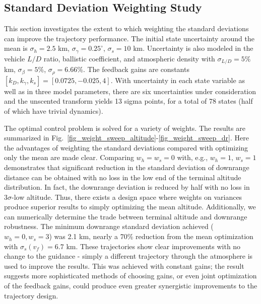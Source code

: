 \documentclass[journal ]{new-aiaa}
\begin{document}
\subsection*{Standard Deviation Weighting Study}
This section investigates the extent to which weighting the standard deviations can improve the trajectory performance. The initial state uncertainty around the mean is $\sigma_h = 2.5$ km, $\sigma_{\gamma} = 0.25^{\circ}$, $\sigma_s = 10$ km. Uncertainty is also modeled in the vehicle $L/D$ ratio, ballistic coefficient, and atmospheric density with $\sigma_{L/D} = 5\%$ km, $\sigma_{\beta} = 5\%$, $\sigma_{\rho} = 6.66\%$. The feedback gains are constants $[k_D, k_{\gamma}, k_s] = [0.0725, -0.025, 4]$. With uncertainty in each state variable as well as in three model parameters, there are six uncertainties under consideration and the unscented transform yields 13 sigma points, for a total of 78 states (half of which have trivial dynamics). 

The optimal control problem is solved for a variety of weights. The results are summarized in Fig.~\ref{fig_weight_sweep_altitude}-\ref{fig_weight_sweep_dr}. Here the advantages of weighting the standard deviations compared with optimizing only the mean are made clear. Comparing $w_h=w_s=0$ with, e.g., $w_h=1,\,w_s = 1$ demonstrates that significant reduction in the standard deviation of downrange distance can be obtained with no loss in the low end of the terminal altitude distribution. In fact, the downrange deviation is reduced by half with no loss in $3\sigma$-low altitude. Thus, there exists a design space where weights on variances produce superior results to simply optimizing the mean altitude. Additionally, we can numerically determine the trade between terminal altitude and downrange robustness. The minimum downrange standard deviation achieved ($w_h=0,w_s=3$) was 2.1 km, nearly a 70\% reduction from the mean optimization with $\sigma_s(v_f)=6.7$ km. These trajectories show clear improvements with no change to the guidance - simply a different trajectory through the atmosphere is used to improve the results.
This was achieved with constant gains; the result suggests more sophisticated methods of choosing gains, or even joint optimization of the feedback gains, could produce even greater synergistic improvements to the trajectory design. 
\end{document}
